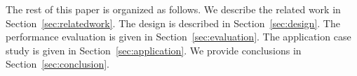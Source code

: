 The rest of this paper is organized as follows. We describe the related work in Section~\ref{sec:relatedwork}. The design is described in Section~\ref{sec:design}.   The performance evaluation is given in Section~\ref{sec:evaluation}. The application case study is given in Section~\ref{sec:application}. We provide conclusions in Section~\ref{sec:conclusion}. %
















